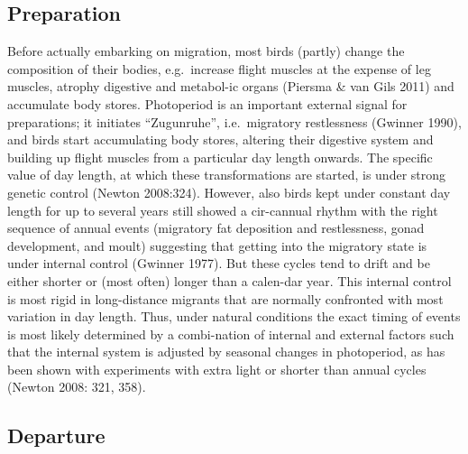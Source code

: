 \documentclass[
]{book}
\begin{document}
\hypertarget{preparation}{%
\subsection{Preparation}\label{preparation}}

Before actually embarking on migration, most birds (partly) change the composition of their bodies, e.g.~increase flight muscles at the expense of leg muscles, atrophy digestive and metabol-ic organs (Piersma \& van Gils 2011) and accumulate body stores. Photoperiod is an important external signal for preparations; it initiates ``Zugunruhe'', i.e.~migratory restlessness (Gwinner 1990), and birds start accumulating body stores, altering their digestive system and building up flight muscles from a particular day length onwards. The specific value of day length, at which these transformations are started, is under strong genetic control (Newton 2008:324).
However, also birds kept under constant day length for up to several years still showed a cir-cannual rhythm with the right sequence of annual events (migratory fat deposition and restlessness, gonad development, and moult) suggesting that getting into the migratory state is under internal control (Gwinner 1977). But these cycles tend to drift and be either shorter or (most often) longer than a calen-dar year. This internal control is most rigid in long-distance migrants that are normally confronted with most variation in day length.
Thus, under natural conditions the exact timing of events is most likely determined by a combi-nation of internal and external factors such that the internal system is adjusted by seasonal changes in photoperiod, as has been shown with experiments with extra light or shorter than annual cycles (Newton 2008: 321, 358).

\hypertarget{departure}{%
\subsection{Departure}\label{departure}}
\end{document}
